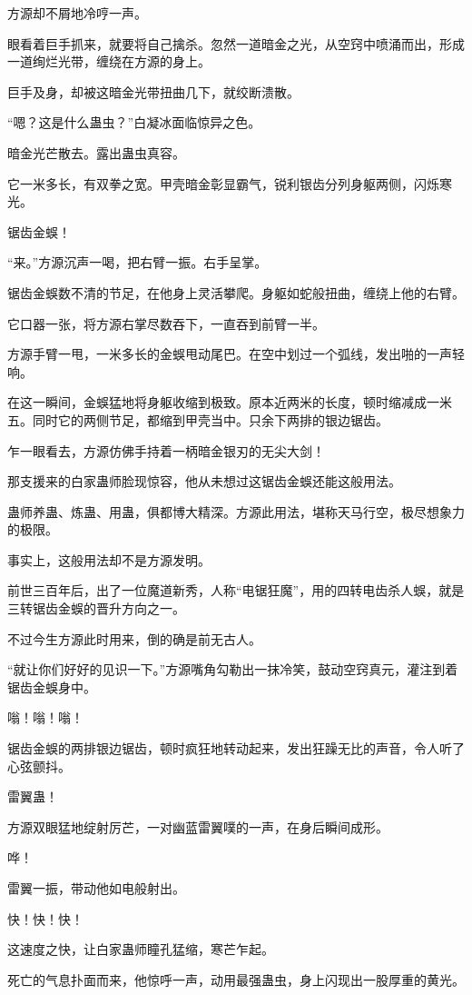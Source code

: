 \begin{this_body}
方源却不屑地冷哼一声。

眼看着巨手抓来，就要将自己擒杀。忽然一道暗金之光，从空窍中喷涌而出，形成一道绚烂光带，缠绕在方源的身上。

巨手及身，却被这暗金光带扭曲几下，就绞断溃散。

“嗯？这是什么蛊虫？”白凝冰面临惊异之色。

暗金光芒散去。露出蛊虫真容。

它一米多长，有双拳之宽。甲壳暗金彰显霸气，锐利银齿分列身躯两侧，闪烁寒光。

锯齿金蜈！

“来。”方源沉声一喝，把右臂一振。右手呈掌。

锯齿金蜈数不清的节足，在他身上灵活攀爬。身躯如蛇般扭曲，缠绕上他的右臂。

它口器一张，将方源右掌尽数吞下，一直吞到前臂一半。

方源手臂一甩，一米多长的金蜈甩动尾巴。在空中划过一个弧线，发出啪的一声轻响。

在这一瞬间，金蜈猛地将身躯收缩到极致。原本近两米的长度，顿时缩减成一米五。同时它的两侧节足，都缩到甲壳当中。只余下两排的银边锯齿。

乍一眼看去，方源仿佛手持着一柄暗金银刃的无尖大剑！

那支援来的白家蛊师脸现惊容，他从未想过这锯齿金蜈还能这般用法。

蛊师养蛊、炼蛊、用蛊，俱都博大精深。方源此用法，堪称天马行空，极尽想象力的极限。

事实上，这般用法却不是方源发明。

前世三百年后，出了一位魔道新秀，人称“电锯狂魔”，用的四转电齿杀人蜈，就是三转锯齿金蜈的晋升方向之一。

不过今生方源此时用来，倒的确是前无古人。

“就让你们好好的见识一下。”方源嘴角勾勒出一抹冷笑，鼓动空窍真元，灌注到着锯齿金蜈身中。

嗡！嗡！嗡！

锯齿金蜈的两排银边锯齿，顿时疯狂地转动起来，发出狂躁无比的声音，令人听了心弦颤抖。

雷翼蛊！

方源双眼猛地绽射厉芒，一对幽蓝雷翼噗的一声，在身后瞬间成形。

哗！

雷翼一振，带动他如电般射出。

快！快！快！

这速度之快，让白家蛊师瞳孔猛缩，寒芒乍起。

死亡的气息扑面而来，他惊呼一声，动用最强蛊虫，身上闪现出一股厚重的黄光。


\end{this_body}
